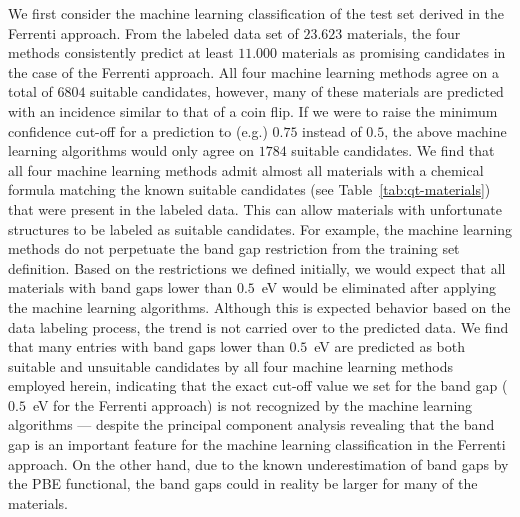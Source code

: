 \documentclass[superscriptaddress,unsortedaddress,
 amsmath,amssymb,
 aps,
]{revtex4-2}
\begin{document}
We first consider the machine learning classification of the test set derived in the Ferrenti approach. 
From the labeled data set of $23.623$ materials, the four methods consistently predict at least $11.000$ materials as promising candidates in the case of the Ferrenti approach. All four machine learning methods agree on a total of $6804$ suitable candidates, however, many of these materials are predicted with an incidence similar to that of a coin flip. If we were to raise the minimum confidence cut-off for a prediction to (e.g.) $0.75$ instead of $0.5$, the above machine learning algorithms would only agree on $1784$ suitable candidates. 
We find that all four machine learning methods admit almost all materials with a chemical formula matching the known suitable candidates (see Table~\ref{tab:qt-materials}) that were present in the labeled data. 
This can allow materials with unfortunate structures to be labeled as suitable candidates. %
For example, the machine learning methods do not perpetuate the band gap restriction from the training set definition. 
Based on the restrictions we defined initially, we would expect that all materials with band gaps lower than $0.5$~eV would be eliminated 
after applying the machine learning algorithms.  
Although this is expected behavior based on the data labeling process, the trend is not carried over to the predicted data. We find that many entries with band gaps lower than $0.5$~eV are predicted as both suitable and unsuitable candidates by all four machine learning methods employed herein, 
indicating that the exact cut-off value we set for the band gap ($0.5$~eV for the Ferrenti approach) is not recognized by the machine learning algorithms --- despite the principal component analysis revealing that the band gap is an important feature for the machine learning classification in the Ferrenti approach.  
On the other hand, due to the known underestimation of band gaps by the PBE functional, the band gaps could in reality be larger for many of the materials. 
\end{document}
